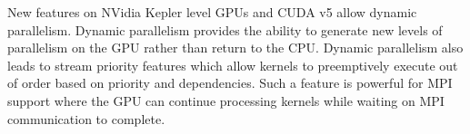 New features on NVidia Kepler level GPUs and CUDA v5 allow dynamic parallelism. Dynamic parallelism provides the ability to generate new levels of parallelism on the GPU rather than return to the CPU.  Dynamic parallelism also leads to stream priority features which allow kernels to preemptively execute out of order based on priority and dependencies. Such a feature is powerful for MPI support where the GPU can continue processing kernels while waiting on MPI communication to complete. 
